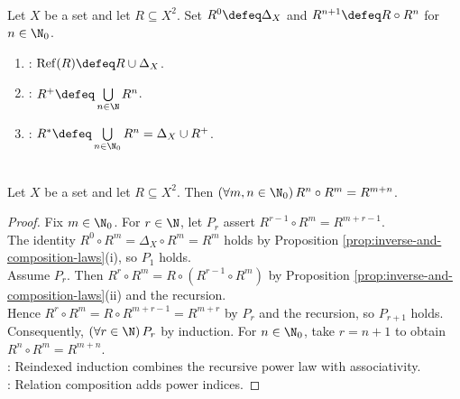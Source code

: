 \begin{definition} \label{def:relation-powers-and-closures} \\
Let $X$ be a set and let $R\subseteq X^2$. Set $R^0\defeq\Delta_X$ and $R^{n+1}\defeq R\circ R^n$ for $n\in\N_0$.
\begin{enumerate}[label=(\roman*)]
\setlength{\itemsep}{0pt}
\item {}: $\operatorname{Ref}(R)\defeq R\cup\Delta_X$.
\item {}: $R^+\defeq\bigcup\limits_{n\in\N}R^n$.
\item {}: $R^*\defeq\bigcup\limits_{n\in\N_0}R^n=\Delta_X\cup R^+$.
\end{enumerate}
\end{definition}

\begin{lemma} \label{lem:addition-law-for-relation-powers} \\
Let $X$ be a set and let $R\subseteq X^2$. Then $(\forall m,n\in\N_0)\,R^n\circ R^m=R^{m+n}$.
\begin{proof} Fix $m\in\N_0$. For $r\in\N$, let $P_r$ assert $R^{r-1}\circ R^m=R^{m+r-1}$.\\
The identity $R^0\circ R^m=\Delta_X\circ R^m=R^m$ holds by Proposition \ref{prop:inverse-and-composition-laws}(i), so $P_1$ holds.\\
Assume $P_r$. Then $R^r\circ R^m=R\circ(R^{r-1}\circ R^m)$ by Proposition \ref{prop:inverse-and-composition-laws}(ii) and the recursion.\\
Hence $R^r\circ R^m=R\circ R^{m+r-1}=R^{m+r}$ by $P_r$ and the recursion, so $P_{r+1}$ holds.\\
Consequently, $(\forall r\in\N)\,P_r$ by induction. For $n\in\N_0$, take $r=n+1$ to obtain $R^n\circ R^m=R^{m+n}$.\\
: Reindexed induction combines the recursive power law with associativity.\\
: Relation composition adds power indices.
\end{proof}
\end{lemma}

